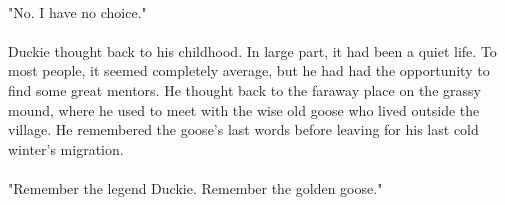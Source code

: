 \documentclass[a4paper,10pt,standalone]{book}
\begin{document}
\paragraph{} "No. I have no choice." 
\paragraph{} Duckie thought back to his childhood. In large part, it had been a quiet life. To most people, it seemed completely average, but he had had the opportunity to find some great mentors. He thought back to the faraway place on the grassy mound, where he used to meet with the wise old goose who lived outside the village. He remembered the goose's last words before leaving for his last cold winter's migration.
\paragraph{} "Remember the legend Duckie. Remember the golden goose." 
\vfill
\pagebreak








\end{document}
